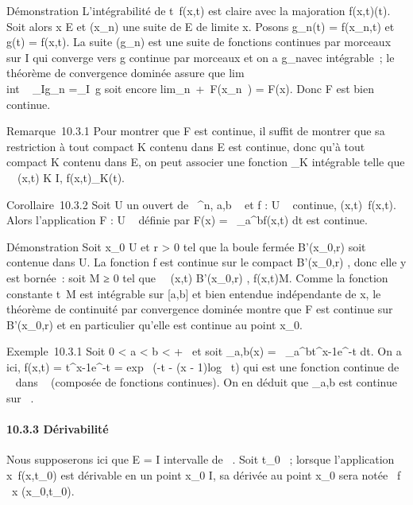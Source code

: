 \documentclass[]{article}
\begin{document}
Démonstration L'intégrabilité de t\mapsto~f(x,t) est
claire avec la majoration f(x,t)\leq \phi(t). Soit alors x
\in E et (x_n) une suite de E de limite x. Posons g_n(t)
= f(x_n,t) et g(t) = f(x,t). La suite (g_n) est une
suite de fonctions continues par morceaux sur I qui converge vers g
continue par morceaux et on a g_n\leq \phi avec \phi
intégrable~; le théorème de convergence dominée assure que
lim\\int ~
_Ig_n =\int  _I~g soit
encore lim_n\rightarrow~+\infty~F(x_n~) =
F(x). Donc F est bien continue.

Remarque~10.3.1 Pour montrer que F est continue, il suffit de montrer
que sa restriction à tout compact K contenu dans E est continue, donc
qu'à tout compact K contenu dans E, on peut associer une fonction
\phi_K intégrable telle que \forall~~(x,t) \in K \times
I, f(x,t)\leq \phi_K(t).

Corollaire~10.3.2 Soit U un ouvert de ~^n, a,b \in {}~ et f : U \times
[a,b] \rightarrow~  continue, (x,t)\mapsto~f(x,t). Alors
l'application F : U \rightarrow~  définie par F(x) =\int ~
_a^bf(x,t) dt est continue.

Démonstration Soit x_0 \in U et r > 0 tel que la
boule fermée B'(x_0,r) soit contenue dans U. La fonction f est
continue sur le compact B'(x_0,r) \times [a,b], donc elle y est
bornée~: soit M ≥ 0 tel que \forall~~(x,t) \in
B'(x_0,r) \times [a,b], f(x,t)\leq M. Comme la
fonction constante t\mapsto~M est intégrable sur
[a,b] et bien entendue indépendante de x, le théorème de continuité
par convergence dominée montre que F est continue sur B'(x_0,r)
et en particulier qu'elle est continue au point x_0.

Exemple~10.3.1 Soit 0 < a < b < +\infty~ et soit
\Gamma_a,b(x) =\int ~
_a^bt^x-1e^-t dt. On a ici, f(x,t) =
t^x-1e^-t = exp~ (-t - (x
- 1)log~ t) qui est une fonction continue de ~
\times [a,b] dans ~ (composée de fonctions continues). On en déduit que
\Gamma_a,b est continue sur ~.

\paragraph{10.3.3 Dérivabilité}

Nous supposerons ici que E = I intervalle de ~. Soit t_0 \in
[a,b]~; lorsque l'application
x\mapsto~f(x,t_0) est dérivable en un point
x_0 \in I, sa dérivée au point x_0 sera notée  \partial~f
\over \partial~x (x_0,t_0).
\end{document}
